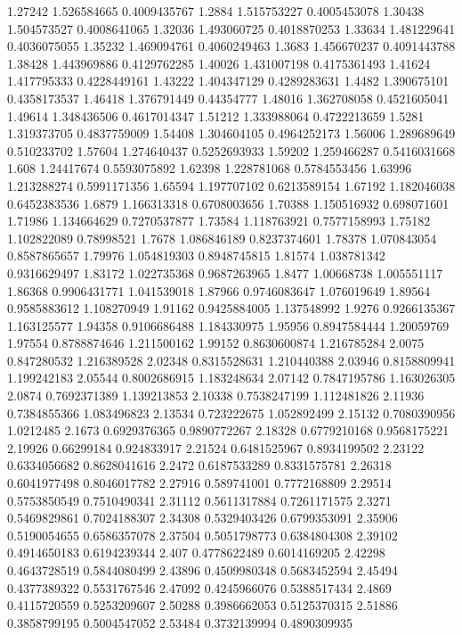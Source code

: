 {1.27242 1.526584665 0.4009435767
1.2884 1.515753227 0.4005453078
1.30438 1.504573527 0.4008641065
1.32036 1.493060725 0.4018870253
1.33634 1.481229641 0.4036075055
1.35232 1.469094761 0.4060249463
1.3683 1.456670237 0.4091443788
1.38428 1.443969886 0.4129762285
1.40026 1.431007198 0.4175361493
1.41624 1.417795333 0.4228449161
1.43222 1.404347129 0.4289283631
1.4482 1.390675101 0.4358173537
1.46418 1.376791449 0.44354777
1.48016 1.362708058 0.4521605041
1.49614 1.348436506 0.4617014347
1.51212 1.333988064 0.4722213659
1.5281 1.319373705 0.4837759009
1.54408 1.304604105 0.4964252173
1.56006 1.289689649 0.510233702
1.57604 1.274640437 0.5252693933
1.59202 1.259466287 0.5416031668
1.608 1.24417674 0.5593075892
1.62398 1.228781068 0.5784553456
1.63996 1.213288274 0.5991171356
1.65594 1.197707102 0.6213589154
1.67192 1.182046038 0.6452383536
1.6879 1.166313318 0.6708003656
1.70388 1.150516932 0.698071601
1.71986 1.134664629 0.7270537877
1.73584 1.118763921 0.7577158993
1.75182 1.102822089 0.78998521
1.7678 1.086846189 0.8237374601
1.78378 1.070843054 0.8587865657
1.79976 1.054819303 0.8948745815
1.81574 1.038781342 0.9316629497
1.83172 1.022735368 0.9687263965
1.8477 1.00668738 1.005551117
1.86368 0.9906431771 1.041539018
1.87966 0.9746083647 1.076019649
1.89564 0.9585883612 1.108270949
1.91162 0.9425884005 1.137548992
1.9276 0.9266135367 1.163125577
1.94358 0.9106686488 1.184330975
1.95956 0.8947584444 1.20059769
1.97554 0.8788874646 1.211500162
1.99152 0.8630600874 1.216785284
2.0075 0.847280532 1.216389528
2.02348 0.8315528631 1.210440388
2.03946 0.8158809941 1.199242183
2.05544 0.8002686915 1.183248634
2.07142 0.7847195786 1.163026305
2.0874 0.7692371389 1.139213853
2.10338 0.7538247199 1.112481826
2.11936 0.7384855366 1.083496823
2.13534 0.723222675 1.052892499
2.15132 0.7080390956 1.0212485
2.1673 0.6929376365 0.9890772267
2.18328 0.6779210168 0.9568175221
2.19926 0.66299184 0.924833917
2.21524 0.6481525967 0.8934199502
2.23122 0.6334056682 0.8628041616
2.2472 0.6187533289 0.8331575781
2.26318 0.6041977498 0.8046017782
2.27916 0.589741001 0.7772168809
2.29514 0.5753850549 0.7510490341
2.31112 0.5611317884 0.7261171575
2.3271 0.5469829861 0.7024188307
2.34308 0.5329403426 0.6799353091
2.35906 0.5190054655 0.6586357078
2.37504 0.5051798773 0.6384804308
2.39102 0.4914650183 0.6194239344
2.407 0.4778622489 0.6014169205
2.42298 0.4643728519 0.5844080499
2.43896 0.4509980348 0.5683452594
2.45494 0.4377389322 0.5531767546
2.47092 0.4245966076 0.5388517434
2.4869 0.4115720559 0.5253209607
2.50288 0.3986662053 0.5125370315
2.51886 0.3858799195 0.5004547052
2.53484 0.3732139994 0.4890309935
}
